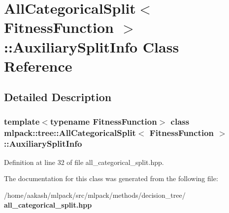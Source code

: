 \section{All\+Categorical\+Split$<$ Fitness\+Function $>$\+:\+:Auxiliary\+Split\+Info Class Reference}
\label{classmlpack_1_1tree_1_1AllCategoricalSplit_1_1AuxiliarySplitInfo}


\subsection{Detailed Description}
\subsubsection*{template$<$typename Fitness\+Function$>$\newline
class mlpack\+::tree\+::\+All\+Categorical\+Split$<$ Fitness\+Function $>$\+::\+Auxiliary\+Split\+Info}



Definition at line 32 of file all\+\_\+categorical\+\_\+split.\+hpp.



The documentation for this class was generated from the following file\+:\begin{DoxyCompactItemize}
\item 
/home/aakash/mlpack/src/mlpack/methods/decision\+\_\+tree/\textbf{ all\+\_\+categorical\+\_\+split.\+hpp}\end{DoxyCompactItemize}
